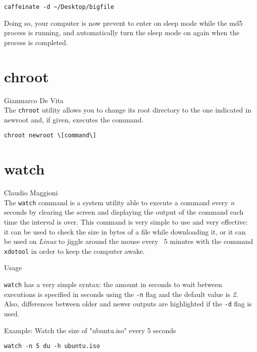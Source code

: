 \documentclass[hidelinks,12pt,a4paper,numbers=enddot]{scrartcl}
\begin{document}
\begin{verbatim}
caffeinate -d ~/Desktop/bigfile
\end{verbatim}

Doing so, your computer is now prevent to enter on sleep mode while the md5 process is running,
and automatically turn the sleep mode on again when the process is completed.

\section{chroot}


\large Gianmarco De Vita \normalsize\\


The \texttt{chroot} utility allows you to change its root directory to
the one indicated in newroot and, if given, executes the command.\\

\begin{verbatim}
chroot newroot \[command\]
\end{verbatim}

\section{watch}


\large Claudio Maggioni \normalsize\\


The \texttt{watch} command is a system utility able to execute a command
every \emph{n} seconds by clearing the screen and displaying the
output of the command each time the interval is over. This command is very
simple to use and very effective: it can be used to check the size in bytes
of a file while downloading it, or it can be used on \emph{Linux} to jiggle
around the mouse every ~5 minutes with the command \texttt{xdotool} in
order to keep the computer awake.

Usage

\texttt{watch} has a very simple syntax: the amount in seconds to wait
between executions is specified in seconds using the \texttt{-n} flag
and the default value is \emph{2}. Also, differences between older and
newer outputs are highlighted if the \texttt{-d} flag is used.

Example: Watch the size of "ubuntu.iso" every 5 seconds

\begin{verbatim}
watch -n 5 du -h ubuntu.iso
\end{verbatim}
\end{document}
